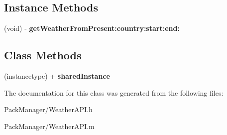\subsection*{Instance Methods}
\begin{DoxyCompactItemize}
\item 
\hypertarget{interface_weather_a_p_i_a27e9821f810c47a376c8937c85be0637}{(void) -\/ {\bfseries get\-Weather\-From\-Present\-:country\-:start\-:end\-:}}\label{interface_weather_a_p_i_a27e9821f810c47a376c8937c85be0637}

\end{DoxyCompactItemize}
\subsection*{Class Methods}
\begin{DoxyCompactItemize}
\item 
\hypertarget{interface_weather_a_p_i_a140d5b84ad32b8b208e8750882602040}{(instancetype) + {\bfseries shared\-Instance}}\label{interface_weather_a_p_i_a140d5b84ad32b8b208e8750882602040}

\end{DoxyCompactItemize}


The documentation for this class was generated from the following files\-:\begin{DoxyCompactItemize}
\item 
Pack\-Manager/Weather\-A\-P\-I.\-h\item 
Pack\-Manager/Weather\-A\-P\-I.\-m\end{DoxyCompactItemize}
